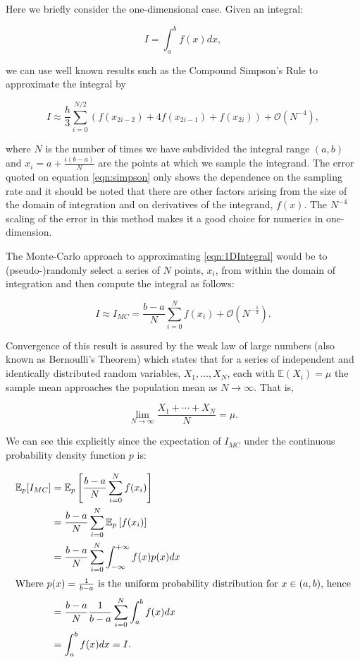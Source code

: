 	Here we briefly consider the one-dimensional case.  Given an integral:

	\begin{equation}
		I = \int_a^b f(x)dx,
		\label{eqn:1DIntegral}
	\end{equation}

	we can use well known results such as the Compound Simpson's Rule to approximate the integral by

	\begin{equation}
		I \approx \frac{h}{3}\sum_{i=0}^{N/2}\left(f(x_{2i-2}) + 4f(x_{2i-1}) + f(x_{2i})\right) + \mathcal{O}(N^{-4}),
		\label{eqn:simpson}
	\end{equation}

	where $N$ is the number of times we have subdivided the integral range $(a, b)$ and $x_i = a + \frac{i(b-a)}{N}$ are the points at which we sample the integrand.
	The error quoted on equation \ref{eqn:simpson} only shows the dependence on the sampling rate and it should be noted that there are other factors arising
	from the size of the domain of integration and on derivatives of the integrand, $f(x)$.  The $N^{-4}$ scaling of the error in this method makes it a good choice
	for numerics in one-dimension.

	The Monte-Carlo approach to approximating \ref{eqn:1DIntegral} would be to (pseudo-)randomly select a series of $N$ points, $x_i$, from within the domain of integration
	and then compute the integral as follows:

	\begin{equation}
		I \approx I_{MC} = \frac{b-a}{N}\sum_{i=0}^{N}f(x_i) + \mathcal{O}(N^{-\frac{1}{2}}).
	\end{equation}

	Convergence of this result is assured by the weak law of large numbers (also known as Bernoulli's Theorem) which states that for a series of
	independent and identically distributed random variables, ${X_1,\ldots,X_N}$, each with $\mathbb{E}(X_i) = \mu$ the sample mean approaches the population mean as $N\rightarrow\infty$.
	That is,

	\begin{equation}
		\lim_{N\rightarrow\infty}\frac{X_1+\cdots+X_N}{N}=\mu.
	\end{equation}

	We can see this explicitly since the expectation of $I_{MC}$ under the continuous probability density function $p$ is:

	\begin{align*}
		\mathbb{E}_p[I_{MC}] &= \mathbb{E}_p\left[\frac{b-a}{N}\sum_{i=0}^{N}f(x_i)\right]    \\
		                   &= \frac{b-a}{N}\sum_{i=0}^{N}\mathbb{E}_p\left[f(x_i)\right]    \\
		                   &= \frac{b-a}{N}\sum_{i=0}^{N}\int_{-\infty}^{+\infty}f(x)p(x)dx \\
		                   \intertext{Where $p(x)=\frac{1}{b-a}$ is the uniform probability distribution for $x\in(a, b)$, hence}
		                   &= \frac{b-a}{N}\frac{1}{b-a}\sum_{i=0}^{N}\int_{a}^{b}f(x)dx \\
		                   &= \int_{a}^{b}f(x)dx = I.
	\end{align*}

